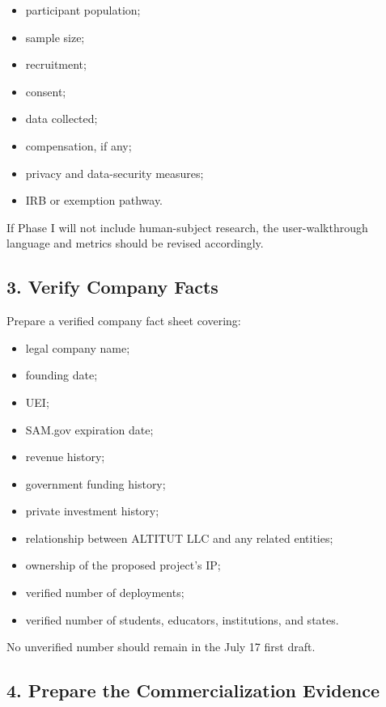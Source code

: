 \documentclass[11pt,letterpaper]{article}
\begin{document}
\begin{itemize}[leftmargin=0.25in]
    \item participant population;
    \item sample size;
    \item recruitment;
    \item consent;
    \item data collected;
    \item compensation, if any;
    \item privacy and data-security measures;
    \item IRB or exemption pathway.
\end{itemize}

If Phase I will not include human-subject research, the user-walkthrough
language and metrics should be revised accordingly.

\subsection{3. Verify Company Facts}

Prepare a verified company fact sheet covering:

\begin{itemize}[leftmargin=0.25in]
    \item legal company name;
    \item founding date;
    \item UEI;
    \item SAM.gov expiration date;
    \item revenue history;
    \item government funding history;
    \item private investment history;
    \item relationship between ALTITUT LLC and any related entities;
    \item ownership of the proposed project's IP;
    \item verified number of deployments;
    \item verified number of students, educators, institutions, and states.
\end{itemize}

No unverified number should remain in the July 17 first draft.

\subsection{4. Prepare the Commercialization Evidence}
\end{document}

